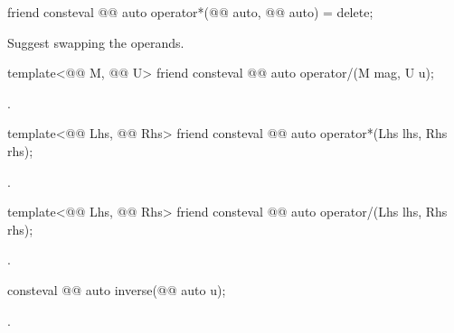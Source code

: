 \begin{itemdecl}
friend consteval @@ auto operator*(@@ auto, @@ auto) = delete;
\end{itemdecl}

\begin{itemdescr}
\pnum
\recommended
Suggest swapping the operands.
\end{itemdescr}

\begin{itemdecl}
template<@@ M, @@ U>
friend consteval @@ auto operator/(M mag, U u);
\end{itemdecl}

\begin{itemdescr}
\pnum
\returns
{}.
\end{itemdescr}

\begin{itemdecl}
template<@@ Lhs, @@ Rhs>
friend consteval @@ auto operator*(Lhs lhs, Rhs rhs);
\end{itemdecl}

\begin{itemdescr}
\pnum
\returns
{}.
\end{itemdescr}

\begin{itemdecl}
template<@@ Lhs, @@ Rhs>
friend consteval @@ auto operator/(Lhs lhs, Rhs rhs);
\end{itemdecl}

\begin{itemdescr}
\pnum
\returns
{}.
\end{itemdescr}

\begin{itemdecl}
consteval @@ auto inverse(@@ auto u);
\end{itemdecl}

\begin{itemdescr}
\pnum
\returns
{}.
\end{itemdescr}

